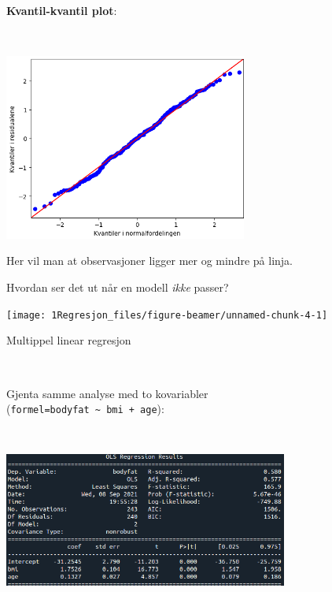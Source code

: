 \documentclass[10pt,ignorenonframetext,]{beamer}
\begin{document}
\begin{frame}

\(~\)

\textbf{Kvantil-kvantil plot}:

\(~\)

\centering

\includegraphics[width=0.6\textwidth,height=\textheight]{kvantilplot.png}

\flushleft

Her vil man at observasjoner ligger mer og mindre på linja.

\end{frame}

\begin{frame}

Hvordan ser det ut når en modell \emph{ikke} passer?

\begin{center}\texttt{[image: 1Regresjon\_files/figure-beamer/unnamed-chunk-4-1]} \end{center}

\end{frame}

\begin{frame}[fragile]

\begin{block}{Multippel linear regresjon}

\(~\)

Gjenta samme analyse med to kovariabler\\
(\texttt{formel=\textquotesingle{}bodyfat\ \textasciitilde{}\ bmi\ +\ age\textquotesingle{}}):

\(~\)

\includegraphics[width=0.7\textwidth,height=\textheight]{ols_result_2.png}

\vspace{20mm}

\end{block}

\end{frame}
\end{document}
